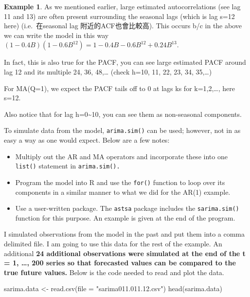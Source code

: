 \documentclass[
]{book}
\newenvironment{Shaded}{\begin{snugshade}}{\end{snugshade}}
\newcommand{\AttributeTok}[1]{\textcolor[rgb]{0.77,0.63,0.00}{#1}}
\newcommand{\FunctionTok}[1]{\textcolor[rgb]{0.00,0.00,0.00}{#1}}
\newcommand{\NormalTok}[1]{#1}
\newcommand{\OtherTok}[1]{\textcolor[rgb]{0.56,0.35,0.01}{#1}}
\newcommand{\StringTok}[1]{\textcolor[rgb]{0.31,0.60,0.02}{#1}}
\providecommand{\tightlist}{%
  \setlength{\itemsep}{0pt}\setlength{\parskip}{0pt}}
\theoremstyle{definition}
\theoremstyle{definition}
\newtheorem{example}{Example}[chapter]
\theoremstyle{definition}
\theoremstyle{definition}
\theoremstyle{remark}
\begin{document}
\begin{example}
As we mentioned earlier, large estimated autocorrelations (see lag 11 and 13) are often present surrounding the seasonal lags (which is lag s=12 here) (i.e.~在seasonal lag 附近的ACF也會比較高). This occurs b/c in the above we can write the model in this way \((1 - 0.4B)(1 - 0.6B^{12}) = 1 - 0.4B - 0.6B^{12} + 0.24B^{13}\).

In fact, this is also true for the PACF, you can see large estimated PACF around lag 12 and its multiple 24, 36, 48,\ldots{}
(check h=10, 11, 22, 23, 34, 35,\ldots)

For MA(Q=1), we expect the PACF tails off to 0 at lags ks for k=1,2,\ldots, here s=12.

Also notice that for lag h=0\textasciitilde10, you can see them as non-seasonal components.

To simulate data from the model, \texttt{arima.sim()} can be used; however, not in as easy a way as one would expect. Below are a few notes:

\begin{itemize}
\tightlist
\item
  Multiply out the AR and MA operators and incorporate these into one \texttt{list()} statement in \texttt{arima.sim().}\\
\item
  Program the model into R and use the \texttt{for()} function to loop over its components in a similar manner to what we did for the AR(1) example.
\item
  Use a user-written package. The \texttt{astsa} package includes the \texttt{sarima.sim()} function for this purpose. An example is given at the end of the program.
\end{itemize}

I simulated observations from the model in the past and put them into a comma delimited file. I am going to use this data for the rest of the example. An additional \textbf{24 additional observations were simulated at the end of the t = 1, \ldots, 200 series so that forecasted values can be compared to the true future values.} Below is the code needed to read and plot the data.

\begin{Shaded}
\begin{Highlighting}[]
\NormalTok{sarima.data }\OtherTok{\textless{}{-}} \FunctionTok{read.csv}\NormalTok{(}\AttributeTok{file =} \StringTok{"sarima011.011.12.csv"}\NormalTok{) }
\FunctionTok{head}\NormalTok{(sarima.data)}
\end{Highlighting}
\end{Shaded}


\end{example}
\end{document}
